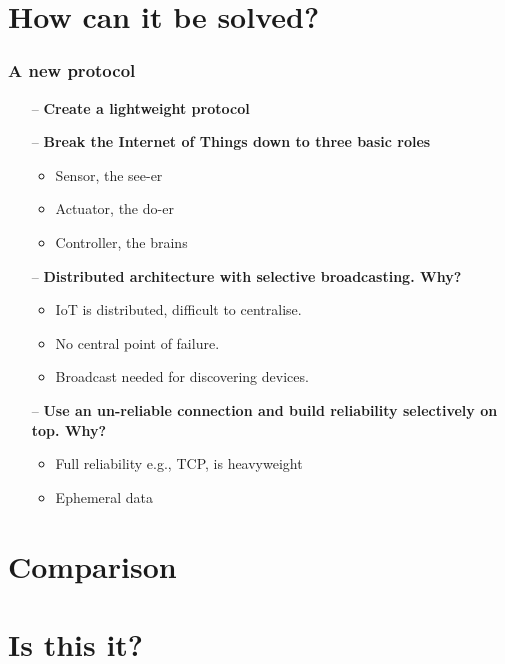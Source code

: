 \documentclass{beamer}
\begin{document}
\section{How can it be solved?} %
\label{sec:how_to_solve_it}
\begin{frame}[t]\frametitle{A new protocol}
\begin{itemize}
  \item [--] \textbf{Create a lightweight protocol}
  \item [--] \textbf{Break the Internet of Things down to three basic roles}
  \begin{itemize}
    \item Sensor, the see-er
    \item Actuator, the do-er
    \item Controller, the brains
  \end{itemize}
  \item [--] \textbf{Distributed architecture with selective broadcasting. Why?}
  \begin{itemize}
    \item IoT is distributed, difficult to centralise.
    \item No central point of failure.
    \item Broadcast needed for discovering devices.
  \end{itemize}
  \item [--] \textbf{Use an un-reliable connection and build reliability selectively on top. Why?}
  \begin{itemize}
    \item Full reliability e.g., TCP, is heavyweight
    \item Ephemeral data
  \end{itemize}
\end{itemize}
\end{frame}

\section{Comparison} %
\label{sec:comparison}


\section{Is this it?} %
\label{sec:is_this_it_}

\end{document}
